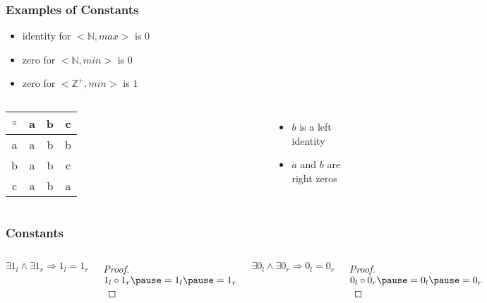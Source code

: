 \documentclass[dvipsnames]{beamer}
\begin{document}
\begin{frame}
  \frametitle{Examples of Constants}

  \begin{example}
    \begin{itemize}
      \item identity for $<\mathbb{N}, max>$ is $0$
      \item zero for $<\mathbb{N}, min>$ is $0$
      \item zero for $<\mathbb{Z}^+, min>$ is $1$
    \end{itemize}
  \end{example}

  \pause
  \begin{example}
    \begin{columns}
      \begin{tabular}{c||c|c|c}
        $\circ$ & a & b & c\\\hline\hline
              a & a & b & b\\\hline
              b & a & b & c\\\hline
              c & a & b & a
      \end{tabular}

      \begin{itemize}
        \item $b$ is a left identity
        \item $a$ and $b$ are right zeros
      \end{itemize}
    \end{columns}
  \end{example}
\end{frame}

\begin{frame}
  \frametitle{Constants}

  \begin{columns}
    \begin{theorem}
      $\exists 1_l \wedge \exists 1_r \Rightarrow 1_l = 1_r$
    \end{theorem}

    \pause
    \begin{proof}
      $1_l \circ 1_r \pause = 1_l \pause = 1_r$
    \end{proof}

    \pause
    \begin{theorem}
      $\exists 0_l \wedge \exists 0_r \Rightarrow 0_l = 0_r$
    \end{theorem}

    \pause
    \begin{proof}
      $0_l \circ 0_r \pause = 0_l \pause = 0_r$
    \end{proof}
  \end{columns}
\end{frame}
\end{document}
